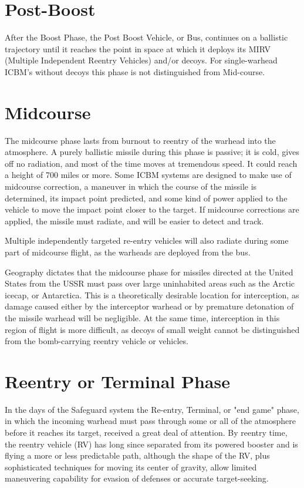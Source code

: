 \section{Post-Boost}
After the Boost Phase, the Post Boost Vehicle, or Bus, continues on a ballistic trajectory until it reaches the point in space at which it deploys its MIRV (Multiple Independent Reentry Vehicles) and/or decoys. For single-warhead ICBM's without decoys this phase is not distinguished from Mid-course.

\section{Midcourse}
The midcourse phase lasts from burnout to reentry of the warhead into the atmosphere. A purely ballistic missile during this phase is passive; it is cold, gives off no radiation, and most of the time moves at tremendous speed. It could reach a height of 700 miles or more. Some ICBM systems are designed to make use of midcourse correction, a maneuver in which the course of the missile is determined, its impact point predicted, and some kind of power applied to the vehicle to move the impact point closer to the target. If midcourse corrections are applied, the missile must radiate, and will be easier to detect and track.

Multiple independently targeted re-entry vehicles will also radiate during some part of midcourse flight, as the warheads are deployed from the bus.

Geography dictates that the midcourse phase for missiles directed at the United States from the USSR must pass over large uninhabited areas such as the Arctic icecap, or Antarctica. This is a theoretically desirable location for interception, as damage caused either by the interceptor warhead or by premature detonation of the missile warhead will be negligible. At the same time, interception in this region of flight is more difficult, as decoys of small weight cannot be distinguished from the bomb-carrying reentry vehicle or vehicles.

\section{Reentry or Terminal Phase}
In the days of the Safeguard system the Re-entry, Terminal, or "end game" phase, in which the incoming warhead must pass through some or all of the atmosphere before it reaches its target, received a great deal of attention. By reentry time, the reentry vehicle (RV) has long since separated from its powered booster and is flying a more or less predictable path, although the shape of the RV, plus sophisticated techniques for moving its center of gravity, allow limited maneuvering capability for evasion of defenses or accurate target-seeking.

